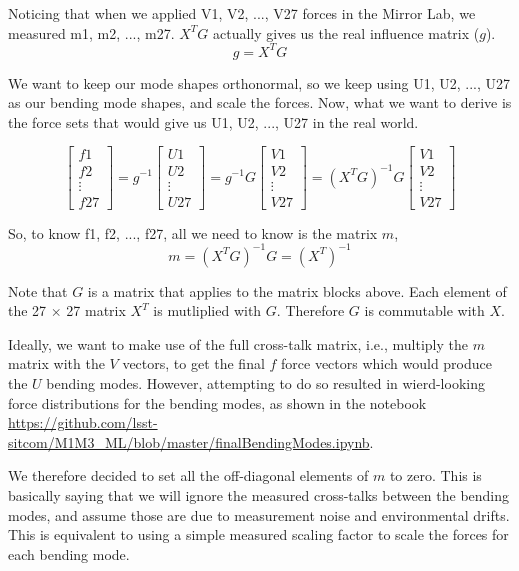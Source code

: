 \documentclass [twoside,openbib,12pt]{article}
\newcommand{\beq}{\begin{equation}}
\newcommand{\eeq}{\end{equation}}
\begin{document}
Noticing that when we applied V1, V2, ..., V27 forces in the Mirror Lab, we measured m1, m2, ..., m27. $X^T G$ actually gives us the real influence matrix ($g$).
\beq
g = X^T G
\eeq

We want to keep our mode shapes orthonormal, so we keep
using U1, U2, ..., U27 as our bending mode shapes,
and scale the forces.
Now, what we want to derive is the force sets that would give us U1, U2, ..., U27 in the real world.

\beq
\left[ \begin{array}{c} f1  \\ f2 \\ \vdots \\ f27 \end{array} \right]
= g^{-1}
\left[ \begin{array}{c} U1  \\ U2 \\ \vdots \\ U27 \end{array} \right]
= g^{-1} G
\left[ \begin{array}{c} V1  \\ V2 \\ \vdots \\ V27 \end{array} \right]
= (X^T G)^{-1} G
\left[ \begin{array}{c} V1  \\ V2 \\ \vdots \\ V27 \end{array} \right]
\eeq

So, to know f1, f2, ..., f27, all we need to know is the matrix $m$,
\beq
m = (X^T G)^{-1} G = (X^T)^{-1}
\eeq

Note that $G$ is a matrix that applies to the matrix blocks
above. Each element of the 27 $\times$ 27 matrix $X^T$ is mutliplied with
$G$. Therefore $G$ is commutable with $X$.

Ideally, we want to make use of the full cross-talk matrix, i.e.,
multiply the $m$ matrix with the $V$ vectors, to get the final $f$
force vectors which would produce the $U$ bending modes.
However, attempting to do so resulted in wierd-looking force
distributions for the bending modes, as shown in the notebook
\url{https://github.com/lsst-sitcom/M1M3_ML/blob/master/finalBendingModes.ipynb}.

We therefore decided to set all the off-diagonal elements of $m$ to
zero. This is basically saying that we will ignore the measured
cross-talks between the bending modes, and assume those are due to
measurement noise and environmental drifts.
This is equivalent to using a simple measured scaling factor to scale
the forces for each bending mode.
\end{document}

